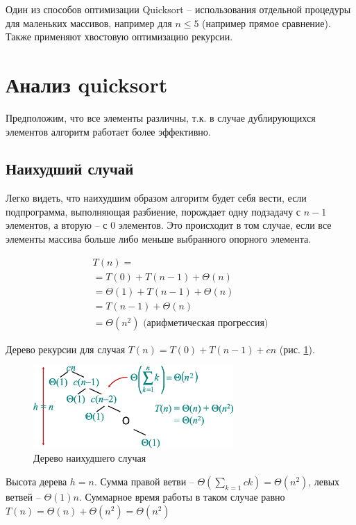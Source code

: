 \documentclass[11pt]{article}
\begin{document}
Один из способов оптимизации Quicksort -- использования отдельной процедуры для маленьких массивов, например для $n \leqslant 5$ (например прямое сравнение). Также применяют хвостовую оптимизацию рекурсии.

\section{Анализ quicksort}

Предположим, что все элементы различны, т.к. в случае дублирующихся элементов алгоритм работает более эффективно.

\subsection{Наихудший случай}

Легко видеть, что наихудшим образом алгоритм будет себя вести, если подпрограмма, выполняющая разбиение, порождает одну подзадачу с $n-1$ элементов, а вторую -- с $0$ элементов. Это происходит в том случае, если все элементы массива больше либо меньше выбранного опорного элемента.

\begin{align*}
  T(n) = \\
    = T(0) + T(n-1) + \Theta(n) \\ 
    = \Theta(1) + T(n-1) + \Theta(n) \\
    = T(n-1) + \Theta(n) \\
    = \Theta(n^2) \text{ (арифметическая прогрессия)}
\end{align*}

Дерево рекурсии для случая $T(n) = T(0) + T(n-1) + cn$ (рис. \ref{fig:tree1}). 

\begin{figure}[ht]
  \centering
  \includegraphics[width=3in]{lecture4/tree1.eps}
  \caption{Дерево наихудшего случая}
  \label{fig:tree1}
\end{figure}

Высота дерева $h = n$. Сумма правой ветви -- $\Theta(\sum_{k=1}ck) = \Theta(n^2)$, левых ветвей -- ${\Theta(1)}n$. Суммарное время работы в таком случае равно $T(n) = \Theta(n) + \Theta(n^2) = \Theta(n^2)$
\end{document}
